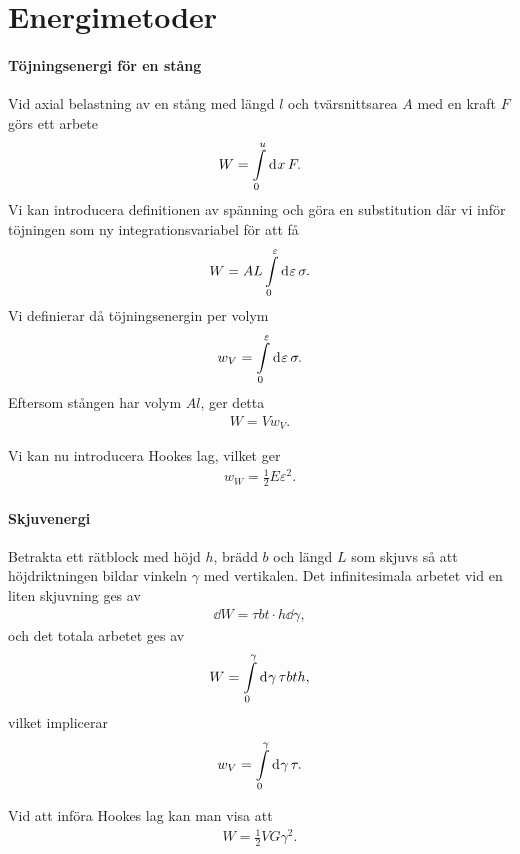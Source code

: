 \section{Energimetoder}

\paragraph{Töjningsenergi för en stång}
Vid axial belastning av en stång med längd $l$ och tvärsnittsarea $A$ med en kraft $F$ görs ett arbete
\begin{align*}
	W = \int\limits_{0}^{u}\dd[]{x}F.
\end{align*}
Vi kan introducera definitionen av spänning och göra en substitution där vi inför töjningen som ny integrationsvariabel för att få
\begin{align*}
	W = AL\int\limits_{0}^{\varepsilon}\dd[]{\varepsilon}\sigma.
\end{align*}
Vi definierar då töjningsenergin per volym
\begin{align*}
	w_{V} = \int\limits_{0}^{\varepsilon}\dd[]{\varepsilon}\sigma.
\end{align*}
Eftersom stången har volym $Al$, ger detta
\begin{align*}
	W = Vw_{V}.
\end{align*}

Vi kan nu introducera Hookes lag, vilket ger
\begin{align*}
	w_{W} = \frac{1}{2}E\varepsilon^{2}.
\end{align*}

\paragraph{Skjuvenergi}
Betrakta ett rätblock med höjd $h$, brädd $b$ och längd $L$ som skjuvs så att höjdriktningen bildar vinkeln $\gamma$ med vertikalen. Det infinitesimala arbetet vid en liten skjuvning ges av
\begin{align*}
	\dd{W} = \tau bt\cdot h\dd{\gamma},
\end{align*}
och det totala arbetet ges av
\begin{align*}
	W = \int\limits_{0}^{\gamma}\dd[]{\gamma}\tau bth,
\end{align*}
vilket implicerar
\begin{align*}
	w_{V} = \int\limits_{0}^{\gamma}\dd[]{\gamma}\tau.
\end{align*}

Vid att införa Hookes lag kan man visa att
\begin{align*}
	W = \frac{1}{2}VG\gamma^{2}.
\end{align*}

